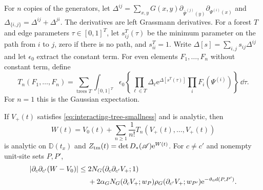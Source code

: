 For $n$ copies of the generators, let
$\Delta^{ij}=\sum_{x,y}G(x,y)
\partial_{\bar\Psi^{(j)}(y)}\partial_{\Psi^{(i)}(x)}$
and $\Delta_{\{i,j\}}=\Delta^{ij}+\Delta^{ji}$.
The derivatives are left Grassmann derivatives.
For a forest $T$ and edge parameters
$\tau\in[0,1]^T$, let $s_{ij}^T(\tau)$ be the
minimum parameter on the path from $i$ to $j$,
zero if there is no path, and $s_{ii}^T=1$.
Write $\Delta[s]=\sum_{i,j}s_{ij}\Delta^{ij}$
and let $\epsilon_0$ extract the constant term.
For even elements $F_1,\ldots,F_n$ without
constant term, define
\begin{equation}\label{eq:interacting-connected-tree}
 T_n(F_1,\ldots,F_n)=
 \sum_{\text{trees }T}\int_{[0,1]^T}
 \epsilon_0\left\{\prod_{\ell\in T}\Delta_\ell
          \mathrm e^{\Delta[s^T(\tau)]}\prod_iF_i(\Psi^{(i)})\right\}\,\dd\tau .
\end{equation}
For $n=1$ this is the Gaussian expectation.

\begin{proposition}\label{prop:interacting-tree-log}
If $V_+(t)$ satisfies
\eqref{eq:interacting-tree-smallness} and is analytic,
then
\[
 W(t)=V_0(t)+\sum_{n\ge1}\frac1{n!}
                       T_n(V_+(t),\ldots,V_+(t))
\]
is analytic on $\mathbb D(t_x)$ and
$Z_{\rm tm}(t)=\det D_*(\mathscr A)\mathrm e^{W(t)}$.
For $c\ne c'$ and nonempty unit-site sets $P,P'$,
\begin{align}
 |\partial_c\partial_{c'}(W-V_0)|
 \le{}&2N_G(\partial_c\partial_{c'}V_+;1)\notag\\
 &+2\alpha_GN_G(\partial_cV_+;w_P)
       \rho_G(\partial_{c'}V_+;w_{P'})
                                  \mathrm e^{-\vartheta_0d(P,P')}.
                                  \label{eq:interacting-tree-mixed}
\end{align}
\end{proposition}

